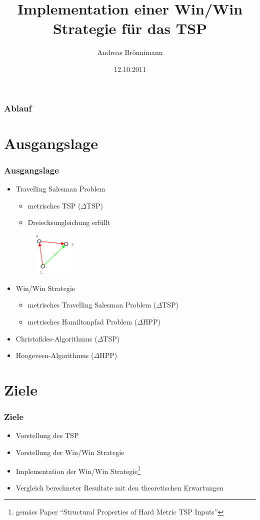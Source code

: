 \documentclass[12pt]{beamer}
\title[Kick-Off Semesterarbeit]{Implementation einer Win/Win Strategie für das TSP}
\author{Andreas Brönnimann}
\institute{Hochschule für Technik Zürich}
\date{12.10.2011}
\begin{document}
    \begin{frame}
        \titlepage
    \end{frame}

    \begin{frame}
        \frametitle{Ablauf}
        \tableofcontents
    \end{frame}

	\section{Ausgangslage}
	\begin{frame}
        \frametitle{Ausgangslage}
		\begin{itemize}
			\item Travelling Salesman Problem	
				\begin{itemize}
					\item metrisches TSP ($\Delta$TSP)
					\item Dreiecksungleichung erfüllt
				\end{itemize}
				\begin{figure}[H]
					\centering
					\includegraphics[width=2cm]{gfx/triangle_inequality}
				\end{figure}
				
			\item Win/Win Strategie
				\begin{itemize}
					\item metrisches Travelling Salesman Problem ($\Delta$TSP)
					\item metrisches Hamiltonpfad Problem ($\Delta$HPP)
				\end{itemize}
				
			\item Christofides-Algorithmus ($\Delta$TSP)
			\item Hoogeveen-Algorithmus ($\Delta$HPP)
		\end{itemize}
    \end{frame}

	\section{Ziele}
	\begin{frame}
        \frametitle{Ziele}
		\begin{itemize}
			\item Vorstellung des TSP
			\item Vorstellung der Win/Win Strategie
			\item Implementation der Win/Win Strategie\footnote{gemäss Paper "`Structural Properties of Hard Metric TSP Inputs"'}
			\item Vergleich berechneter Resultate mit den theoretischen Erwartungen
		\end{itemize}
	\end{frame}
\end{document}
